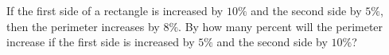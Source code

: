 If the first side of a rectangle is increased by $10\%$ and the second side by $5\%$, then the perimeter increases by $8\%$. By how many percent will the perimeter increase if the first side is increased by $5\%$ and the second side by $10\%$?
